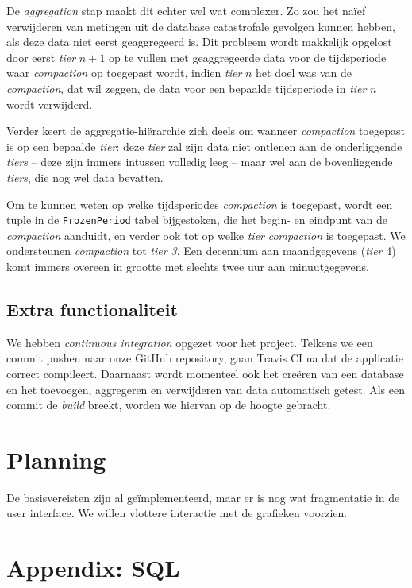 \documentclass[12pt,draft,parskip=full]{article}
\begin{document}
De \emph{aggregation} stap maakt dit echter wel wat complexer. Zo zou het na\"ief verwijderen van metingen uit de database catastrofale gevolgen kunnen hebben, als deze data niet eerst geaggregeerd is. Dit probleem wordt makkelijk opgelost door eerst \emph{tier} $n + 1$ op te vullen met geaggregeerde data voor de tijdsperiode waar \emph{compaction} op toegepast wordt, indien \emph{tier} $n$ het doel was van de \emph{compaction}, dat wil zeggen, de data voor een bepaalde tijdsperiode in \emph{tier} $n$ wordt verwijderd.

Verder keert de aggregatie-hi\"erarchie zich deels om wanneer \emph{compaction} toegepast is op een bepaalde \emph{tier}: deze \emph{tier} zal zijn data niet ontlenen aan de onderliggende \emph{tiers} -- deze zijn immers intussen volledig leeg -- maar wel aan de bovenliggende \emph{tiers}, die nog wel data bevatten.

Om te kunnen weten op welke tijdsperiodes \emph{compaction} is toegepast, wordt een tuple in de \texttt{FrozenPeriod} tabel bijgestoken, die het begin- en eindpunt van de \emph{compaction} aanduidt, en verder ook tot op welke \emph{tier} \emph{compaction} is toegepast. We ondersteunen \emph{compaction} tot \emph{tier 3}. Een decennium aan maandgegevens (\emph{tier} 4) komt immers overeen in grootte met slechts twee uur aan minuutgegevens.

\subsection{Extra functionaliteit}

We hebben 
\emph{continuous integration} opgezet voor het project. Telkens we een {commit} 
pushen naar onze GitHub {repository}, gaan Travis CI na dat de applicatie correct compileert. Daarnaast wordt 
momenteel ook het cre\"eren van een database en het toevoegen, aggregeren en verwijderen van data automatisch getest. Als een commit de \textit{build} breekt, worden we hiervan op de hoogte gebracht.

\section{Planning}
De basisvereisten zijn al ge\"implementeerd, maar er is nog wat fragmentatie in 
de user interface. We willen vlottere interactie met de grafieken voorzien.

\pagebreak
{}
\section{Appendix: SQL}
\label{dbschema}
\lstset{language=SQL,basicstyle=\ttfamily}

\end{document}
